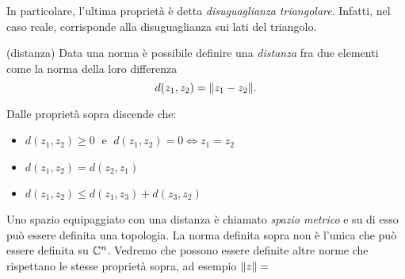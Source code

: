 In particolare, l'ultima proprietà è detta \emph{disuguaglianza triangolare}. Infatti, nel caso reale, corrisponde alla disuguaglianza sui lati del triangolo.\\


\begin{definition}{(distanza)} 
Data una norma è possibile definire una \emph{distanza} fra due elementi come la norma della loro differenza
\begin{equation*}
d(z_1,z_2) = {\|z_1 - z_2\|}.
\end{equation*}  
\end{definition}
Dalle proprietà sopra discende che:
\begin{itemize}
\item $d(z_1,z_2) \geq 0\;$ e $\; d(z_1,z_2) = 0 \Leftrightarrow z_1  = z_2$
\item $d(z_1,z_2) = d(z_2, z_1)$
\item $d(z_1,z_2) \leq d(z_1,z_3) + d(z_3,z_2)$
\end{itemize}
Uno spazio equipaggiato con una distanza è chiamato \emph{spazio metrico} e su di esso può essere definita una topologia. La norma definita sopra non è l'unica che può essere definita su $\mathbb C^n$. Vedremo che possono essere definite altre norme che rispettano le stesse proprietà sopra, ad esempio ${\|z\|} = $
